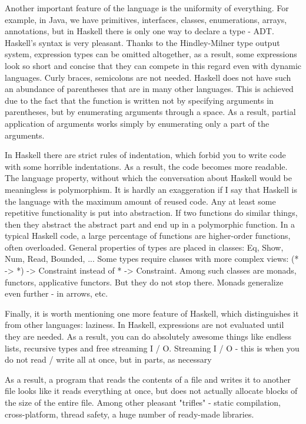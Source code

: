 \documentclass[14pt]{article}
\begin{document}
Another important feature of the language is the uniformity of everything.  For example, in Java, we have primitives, interfaces, classes, enumerations, arrays, annotations, but in Haskell there is only one way to declare a type - ADT. Haskell's syntax is very pleasant.  Thanks to the Hindley-Milner type output system, expression types can be omitted altogether, as a result, some expressions look so short and concise that they can compete in this regard even with dynamic languages.  Curly braces, semicolons are not needed.  Haskell does not have such an abundance of parentheses that are in many other languages.  This is achieved due to the fact that the function is written not by specifying arguments in parentheses, but by enumerating arguments through a space.  As a result, partial application of arguments works simply by enumerating only a part of the arguments.  

In Haskell there are strict rules of indentation, which forbid you to write code with some horrible indentations.  As a result, the code becomes more readable.  The language property, without which the conversation about Haskell would be meaningless is polymorphism.  It is hardly an exaggeration if I say that Haskell is the language with the maximum amount of reused code.  Any at least some repetitive functionality is put into abstraction.  If two functions do similar things, then they abstract the abstract part and end up in a polymorphic function.  In a typical Haskell code, a large percentage of functions are higher-order functions, often overloaded.  General properties of types are placed in classes: Eq, Show, Num, Read, Bounded, ... Some types require classes with more complex views: (* -> *) -> Constraint instead of * -> Constraint.  Among such classes are monads, functors, applicative functors.  But they do not stop there.  Monads generalize even further - in arrows, etc.  

Finally, it is worth mentioning one more feature of Haskell, which distinguishes it from other languages: laziness.  In Haskell, expressions are not evaluated until they are needed.  As a result, you can do absolutely awesome things like endless lists, recursive types and free streaming I / O.  Streaming I / O - this is when you do not read / write all at once, but in parts, as necessary 

As a result, a program that reads the contents of a file and writes it to another file looks like it reads everything at once, but does not actually allocate blocks of the size of the entire file.  Among other pleasant "trifles" - static compilation, cross-platform, thread safety, a huge number of ready-made libraries. 
\end{document}
